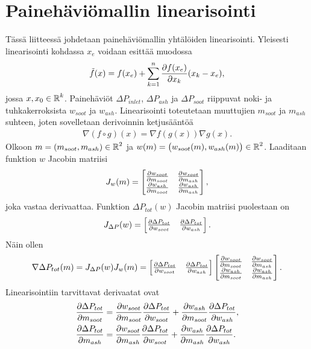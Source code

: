 
\chapter{Painehäviömallin linearisointi}%
\label{ch:linearisointi}

Tässä liitteessä johdetaan painehäviömallin yhtälöiden linearisointi. Yleisesti linearisointi kohdassa \(x_e\) voidaan esittää muodossa
\begin{align}
    \tilde{f}(x) = f(x_e) +\sum_{k=1}^n \frac{\partial f(x_e)}{\partial x_k} (x_k-x_e),
\end{align}
jossa \(x, x_0 \in \operatorname{\mathbb{R}}^k\). 
Painehäviöt \(\Delta P_{inlet}\), \(\Delta P_{ash}\) ja \(\Delta P_{soot}\) riippuvat noki- ja tuhkakerroksista \(w_{soot}\) ja \(w_{ash}\). 
Linearisointi toteutetaan muuttujien \(m_{soot}\) ja \( m_{ash}\) suhteen, joten
sovelletaan derivoinnin ketjusääntöä
\begin{align}
    \nabla (f \circ g)(x) = \nabla f(g(x))\nabla g(x).
\end{align}
Olkoon \(m = \left(m_{soot}, m_{ash}\right) \in \operatorname{\mathbb{R}}^2\) ja \(w(m) = \big(w_{soot}(m), w_{ash}(m)  \big) \in \operatorname{\mathbb{R}}^2\). Laaditaan funktion \(w\) Jacobin matriisi
\begin{align}
    J_w(m)=
    \begin{bmatrix} 
        \frac{\partial w_{soot}}{\partial m_{soot}} & \frac{\partial w_{soot}}{\partial m_{ash}}
    \\  \frac{\partial w_{ash}}{\partial m_{soot}} & \frac{\partial w_{ash}}{\partial m_{ash}}
     \end{bmatrix},
\end{align}
joka vastaa derivaattaa. Funktion \(\Delta P_{tot}(w)\) Jacobin matriisi puolestaan on 
\begin{align}
    J_{\Delta P}(w) = \begin{bmatrix}   \frac{\partial \Delta P_{tot}}{\partial w_{soot}}
    &   \frac{\partial \Delta P_{tot}}{\partial w_{ash}}
     \end{bmatrix}.
\end{align}
Näin ollen 
\begin{align}
    \nabla \Delta P_{tot}(m)=
    J_{\Delta P}(w)  J_{w}(m)
    =
    \begin{bmatrix}   \frac{\partial \Delta P_{tot}}{\partial w_{soot}}
        &   \frac{\partial \Delta P_{tot}}{\partial w_{ash}}
         \end{bmatrix}
    \begin{bmatrix} 
        \frac{\partial w_{soot}}{\partial m_{soot}} & \frac{\partial w_{soot}}{\partial m_{ash}}
    \\  \frac{\partial w_{ash}}{\partial m_{soot}} & \frac{\partial w_{ash}}{\partial m_{ash}}
     \end{bmatrix}.
\end{align}
Linearisointiin tarvittavat derivaatat ovat 
\begin{align}
    \frac{\partial \Delta P_{tot}}{\partial m_{soot}} &=
        \frac{\partial w_{soot}}{\partial m_{soot}}
        \frac{\partial \Delta P_{tot}}{\partial w_{soot}}
        +
        \frac{\partial w_{ash}}{\partial m_{soot}}
        \frac{\partial \Delta P_{tot}}{\partial w_{ash}},
    \\
    \frac{\partial \Delta P_{tot}}{\partial m_{ash}} &=
        \frac{\partial w_{soot}}{\partial m_{ash}}
        \frac{\partial \Delta P_{tot}}{\partial w_{soot}}
        +
        \frac{\partial w_{ash}}{\partial m_{ash}}
        \frac{\partial \Delta P_{tot}}{\partial w_{ash}}.
\end{align}

